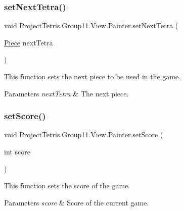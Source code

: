 \subsubsection{\texorpdfstring{set\+Next\+Tetra()}{setNextTetra()}}
{\footnotesize\ttfamily void Project\+Tetris.\+Group11.\+View.\+Painter.\+set\+Next\+Tetra (\begin{DoxyParamCaption}\item[{\hyperlink{class_project_tetris_1_1_group11_1_1_model_1_1_piece}{Piece}}]{next\+Tetra }\end{DoxyParamCaption})}



This function sets the next piece to be used in the game. 


\begin{DoxyParams}{Parameters}
{\em next\+Tetra} & The next piece. \\
\hline
\end{DoxyParams}
\hypertarget{class_project_tetris_1_1_group11_1_1_view_1_1_painter_a53ff8c3c011fba85c87336a10ca9fd47}{}\label{class_project_tetris_1_1_group11_1_1_view_1_1_painter_a53ff8c3c011fba85c87336a10ca9fd47} 
\subsubsection{\texorpdfstring{set\+Score()}{setScore()}}
{\footnotesize\ttfamily void Project\+Tetris.\+Group11.\+View.\+Painter.\+set\+Score (\begin{DoxyParamCaption}\item[{int}]{score }\end{DoxyParamCaption})}



This function sets the score of the game. 


\begin{DoxyParams}{Parameters}
{\em score} & Score of the current game. \\
\hline
\end{DoxyParams}
\hypertarget{class_project_tetris_1_1_group11_1_1_view_1_1_painter_a9ba776edf8c7be3a910e6b3bace4f1c6}{}\label{class_project_tetris_1_1_group11_1_1_view_1_1_painter_a9ba776edf8c7be3a910e6b3bace4f1c6} 

